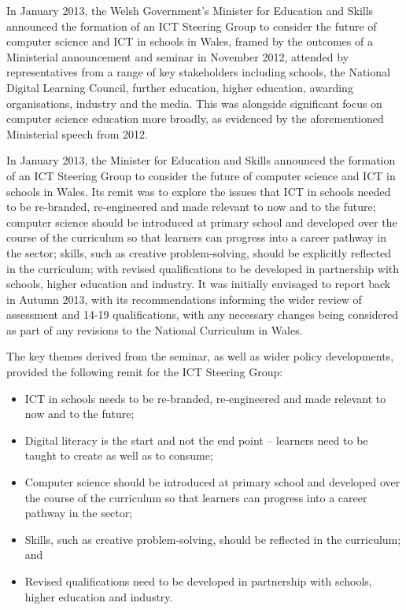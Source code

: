 
In January 2013, the Welsh Government's Minister for Education and
Skills announced the formation of an ICT Steering Group to consider
the future of computer science and ICT in schools in Wales, framed by
the outcomes of a Ministerial announcement and seminar in November
2012, attended by representatives from a range of key stakeholders
including schools, the National Digital Learning Council, further
education, higher education, awarding organisations, industry and the
media. This was alongside significant focus on computer science
education more broadly, as evidenced by the aforementioned Ministerial
speech from 2012.

In January 2013, the Minister for Education and Skills
announced the formation of an ICT Steering Group to consider
the future of computer science and ICT in schools in Wales.
Its remit was to explore the issues that ICT in schools needed to be
re-branded, re-engineered and made relevant to now and to the future;
computer science should be introduced at primary school and developed
over the course of the curriculum so that learners can progress into a
career pathway in the sector; skills, such as creative
problem-solving, should be explicitly reflected in the curriculum;
with revised qualifications to be developed in partnership with
schools, higher education and industry.  It was initially envisaged to
report back in Autumn 2013, with its recommendations informing the
wider review of assessment and 14-19
qualifications, with any necessary changes
being considered as part of any revisions to the National Curriculum
in Wales.

The key themes derived from the seminar, as well as wider policy
developments, provided the following remit for the ICT Steering Group:

\begin{itemize}
\item ICT in schools needs to be re-branded, re-engineered and made
relevant to now and to the future;
\item Digital literacy is the start and not the end point -- learners
need to be taught to create as well as to consume;
\item Computer science should be introduced at primary school and
developed over the course of the curriculum so that learners can
progress into a career pathway in the sector;
\item Skills, such as creative problem-solving, should be reflected in
the curriculum; and
\item Revised qualifications need to be developed in partnership with
schools, higher education and industry.
\end{itemize}

